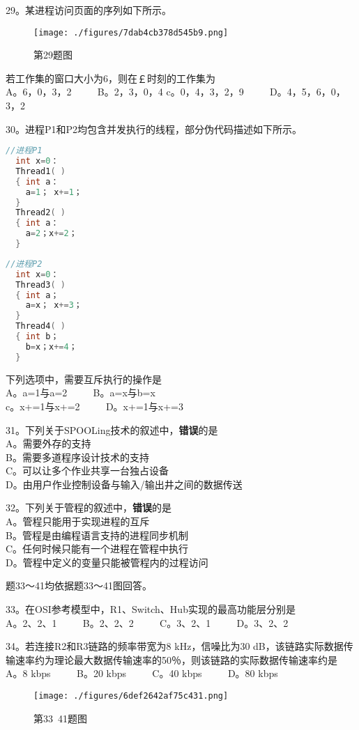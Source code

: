 29。某进程访问页面的序列如下所示。
\begin{figure}[ht]
\centering
\texttt{[image: ./figures/7dab4cb378d545b9.png]}
\caption{第29题图} \label{fig_CSN16_3}
\end{figure}
若工作集的窗口大小为6，则在￡时刻的工作集为 \\
A。{6，0，3，2} $\qquad$ B。{2，3，0，4}
c。{0，4，3，2，9} $\qquad$ D。{4，5，6，0，3，2}

30。进程P1和P2均包含并发执行的线程，部分伪代码描述如下所示。 \\
\begin{lstlisting}[language=cpp]
//进程P1
  int x=0：
  Thread1( )
  { int a：
    a=1； x+=1；
  }
  Thread2( )
  { int a：
    a=2；x+=2；
  }
\end{lstlisting}

\begin{lstlisting}[language=cpp]
//进程P2
  int x=0：
  Thread3( )
  { int a；
    a=x； x+=3；
  }
  Thread4( )
  { int b；
    b=x；x+=4；
  }
\end{lstlisting}
下列选项中，需要互斥执行的操作是 \\
A。a=1与a=2 $\qquad$ B。a=x与b=x \\
c。x+=1与x+=2 $\qquad$ D。x+=1与x+=3

31。下列关于SPOOLing技术的叙述中，\textbf{错误}的是 \\
A。需要外存的支持 \\
B。需要多道程序设计技术的支持 \\
C。可以让多个作业共享一台独占设备 \\
D。由用户作业控制设备与输入/输出井之间的数据传送

32。下列关于管程的叙述中，\textbf{错误}的是 \\
A。管程只能用于实现进程的互斥 \\
B。管程是由编程语言支持的进程同步机制 \\
C。任何时候只能有一个进程在管程中执行 \\
D。管程中定义的变量只能被管程内的过程访问

题33～41均依据题33～41图回答。

33。在OSI参考模型中，R1、Switch、Hub实现的最高功能层分别是 \\
A。2、2、1 $\qquad$ B。2、2、2 $\qquad$ C。3、2、1 $\qquad$ D。3、2、2

34。若连接R2和R3链路的频率带宽为8 kHz，信噪比为30 dB，该链路实际数据传输速率约为理论最大数据传输速率的50％，则该链路的实际数据传输速率约是 \\
A。8 kbps $\qquad$ B。20 kbps $\qquad$ C。40 kbps $\qquad$ D。80 kbps
\begin{figure}[ht]
\centering
\texttt{[image: ./figures/6def2642af75c431.png]}
\caption{第33~41题图} \label{fig_CSN16_4}
\end{figure}

